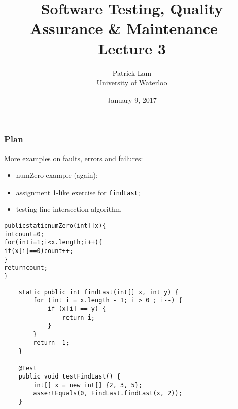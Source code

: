 \documentclass{beamer}
\title{Software Testing, Quality Assurance \& Maintenance---Lecture 3}
\author{Patrick Lam\\University of Waterloo}
\date{January 9, 2017}
\newenvironment{changemargin}[1]{%
  \begin{list}{}{%
    \setlength{\topsep}{0pt}%
    \setlength{\leftmargin}{#1}%
    \setlength{\rightmargin}{1em}
    \setlength{\listparindent}{\parindent}%
    \setlength{\itemindent}{\parindent}%
    \setlength{\parsep}{\parskip}%
  }%
  \item[]}{\end{list}}
\begin{document}
\begin{frame}
  \titlepage
\end{frame}

\begin{frame}
  \frametitle{Plan}

  \begin{changemargin}{2cm}
  More examples on faults, errors and failures:
  \begin{itemize}
  \item numZero example (again);
  \item assignment 1-like exercise for {\tt findLast};
  \item testing line intersection algorithm
  \end{itemize}
  \end{changemargin}
\end{frame}
  
\begin{frame}

  \begin{changemargin}{2em}

\begin{alltt}
public static numZero(int[] x) \{ \\
\quad int count = 0; \\
\quad for (int i = 1; i < x.length; i++) \{ \\
\qquad if (x[i] == 0) count++; \\
\quad \} \\
\quad return count;\\
\}
\end{alltt}
  \end{changemargin}

\end{frame}

\begin{frame}[fragile]

    \begin{lstlisting}
    static public int findLast(int[] x, int y) {
        for (int i = x.length - 1; i > 0 ; i--) {
            if (x[i] == y) {
                return i;
            }
        }
        return -1;
    }

    @Test
    public void testFindLast() {
        int[] x = new int[] {2, 3, 5};
        assertEquals(0, FindLast.findLast(x, 2));
    }
    \end{lstlisting}
  
\end{frame}
\end{document}
